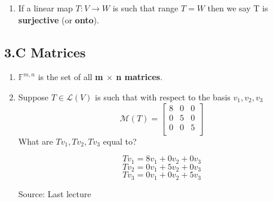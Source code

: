 \documentclass[11pt]{article}
\begin{document}
\begin{enumerate}
\begin{proof}
		as we set out to prove.
		
		\bigskip
		
		Now, for the other direction, suppose that $T$ is injective and show that null $T = \{0\}$.
		
		Suppose for a contradiction that null $T$ is bigger than $\{0\}$. That implies there is some $v$ such that $Tv = 0$, but $v \neq 0$. However, because $T0 = Tv$ but $0 \neq v$, $T$ is not injective. So it must be that null $T = \{0\}$.
		
		\bigskip
		
		This completes the proof.
	\end{proof}

	\item If a linear map $T: V \rightarrow W$ is such that range $T = W$ then we say T is \textbf{surjective} (or \textbf{onto}).
\end{enumerate}

\subsection*{3.C Matrices}
\begin{enumerate}
	\item $\mathbb{F}^{m, n}$ is the set of all \textbf{m $\times$ n matrices}.
	\item Suppose $T \in \mathcal{L}(V)$ is such that with respect to the basis $v_1, v_2, v_3$
	\[\mathcal{M}(T) = 
	\begin{bmatrix}
	8 & 0 & 0 \\
	0 & 5 & 0 \\
	0 & 0 & 5 \\
	\end{bmatrix}
	\]
	What are $Tv_1, Tv_2, Tv_3$ equal to?
	
	\[Tv_1 = 8v_1 + 0v_2 + 0v_3\]
	\[Tv_2 = 0v_1 + 5v_2 + 0v_3\]
	\[Tv_3 = 0v_1 + 0v_2 + 5v_3\]
	
	Source: Last lecture
\end{enumerate}
\end{document}
